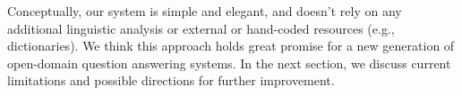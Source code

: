 Conceptually, our system is simple and elegant, and doesn't rely on any additional linguistic analysis or external or hand-coded resources (e.g., dictionaries). We think this approach holds great promise for a new generation of open-domain question answering systems. In the next section, we discuss current limitations and possible directions for further improvement.
